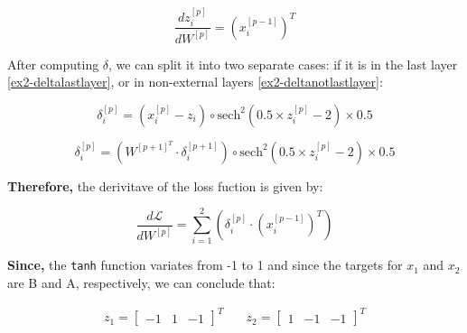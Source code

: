 \documentclass[12pt]{article}
\begin{document}
\begin{enumerate}[leftmargin=\labelsep]
          \begin{equation*}
            \frac{dz^{[p]}_i}{dW^{[p]}} = \left(x^{[p-1]}_i\right)^{T}
          \end{equation*}

          After computing \(\delta\), we can split it into two separate cases: if it is in the last layer \eqref{ex2-deltalastlayer}, or in non-external layers \eqref{ex2-deltanotlastlayer}:

          \begin{equation}\label{ex2-deltalastlayer}
              \delta^{[p]}_i = \left(x^{[p]}_i - z_i\right) \circ \text{sech}^{2}\left(0.5 \times z^{[p]}_i - 2\right) \times 0.5
          \end{equation}

          \begin{equation}\label{ex2-deltanotlastlayer}
              \delta^{[p]}_i = \left(W^{[p+1]^{T}} \cdot \delta^{[p+1]}_i\right) \circ \text{sech}^{2}\left(0.5 \times z^{[p]}_i - 2\right) \times 0.5
          \end{equation}

          \textbf{Therefore,} the derivitave of the loss fuction is given by:

          \begin{equation}\label{ex2-derivate-loss-smiplified}
            \frac{d\mathcal{L}}{dW^{[p]}} = \sum_{i=1}^{2} \left(\delta^{[p]}_i \cdot \left(x^{[p-1]}_i\right)^{T} \right)
          \end{equation}

          \textbf{Since,} the \texttt{tanh} function variates from -1 to 1 and since the targets for $x_1$ and $x_2$ are B and A, respectively, we can conclude that:

          \vskip -0.3cm
          \[
              \begin{array}{cc}
                  z_1 = \begin{bmatrix} -1 & 1 & -1\end{bmatrix}^T & \quad
                  z_2 = \begin{bmatrix} 1 & -1 & -1\end{bmatrix}^T
              \end{array}
          \]


\end{enumerate}
\end{document}
